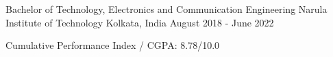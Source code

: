 

  \cventry
    {Bachelor of Technology, Electronics and Communication Engineering}
    {Narula Institute of Technology}
    {Kolkata, India}
    {August 2018 - June 2022}
    {
      \begin{cvitems}
        \item Cumulative Performance Index / CGPA: 8.78/10.0
      \end{cvitems}
    }

